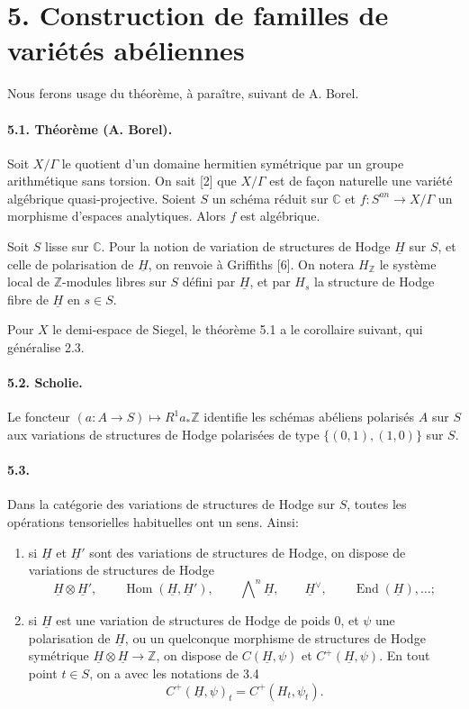 \documentclass[10pt]{article}
\newcommand{\C}{\mathbb{C}}
\newcommand{\Z}{\mathbb{Z}}
\newcommand{\End}{\operatorname{End}}
\newcommand{\Hom}{\operatorname{Hom}}
\begin{document}
\section*{5. Construction de familles de variétés abéliennes}

Nous ferons usage du théorème, à paraître, suivant de A. Borel.

\paragraph{5.1. Théorème (A. Borel).} Soit $X/\Gamma$ le quotient d'un domaine hermitien symétrique par un groupe arithmétique sans torsion. On sait [2] que $X/\Gamma$ est de façon naturelle une variété algébrique quasi-projective. Soient $S$ un schéma réduit sur $\C$ et $f:S^{an}\to X/\Gamma$ un morphisme d'espaces analytiques. Alors $f$ est algébrique.

Soit $S$ lisse sur $\C$. Pour la notion de variation de structures de Hodge $\underline H$ sur $S$, et celle de polarisation de $\underline H$, on renvoie à Griffiths [6]. On notera $H_\Z$ le système local de $\Z$-modules libres sur $S$ défini par $\underline H$, et par $H_s$ la structure de Hodge fibre de $\underline H$ en $s\in S$.

Pour $X$ le demi-espace de Siegel, le théorème 5.1 a le corollaire suivant, qui généralise 2.3.

\paragraph{5.2. Scholie.} Le foncteur $(a:A\to S)\mapsto R^1a_*\Z$ identifie les schémas abéliens polarisés $A$ sur $S$ aux variations de structures de Hodge polarisées de type $\{(0,1),(1,0)\}$ sur $S$.

\paragraph{5.3.} Dans la catégorie des variations de structures de Hodge sur $S$, toutes les opérations tensorielles habituelles ont un sens. Ainsi:
\begin{enumerate}[label=\alph*)]
\item si $\underline H$ et $\underline H'$ sont des variations de structures de Hodge, on dispose de variations de structures de Hodge
\[
\underline H\otimes\underline H',\qquad
\Hom(\underline H,\underline H'),\qquad
\bigwedge\nolimits^n\underline H,\qquad
\underline H^\vee,\qquad
\End(\underline H),\ldots;
\]
\item si $\underline H$ est une variation de structures de Hodge de poids $0$, et $\psi$ une polarisation de $\underline H$, ou un quelconque morphisme de structures de Hodge symétrique $\underline H\otimes\underline H\to\Z$, on dispose de $C(\underline H,\psi)$ et $C^+(\underline H,\psi)$. En tout point $t\in S$, on a avec les notations de 3.4
\[
C^+(\underline H,\psi)_t=C^+(H_t,\psi_t).
\]
\end{enumerate}
\end{document}
